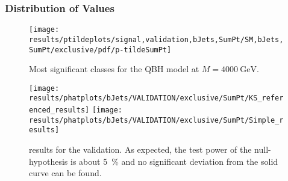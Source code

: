\subsubsection{Distribution of \ptilde Values}
\begin{figure}
    \centering
    
    \vspace{1\baselineskip}
    \texttt{[image: results/ptildeplots/signal,validation,bJets,SumPt/SM,bJets,SumPt/exclusive/pdf/p-tildeSumPt]}
    \caption{Most significant classes for the \ac{QBH} model at $M = \SI{4000}{\GeV}$.}
\end{figure}
%
%
%    
%
%
%
%

\begin{figure}
    \centering
    \texttt{[image: results/phatplots/bJets/VALIDATION/exclusive/SumPt/KS\_referenced\_results]}
    \texttt{[image: results/phatplots/bJets/VALIDATION/exclusive/SumPt/Simple\_results]}
    \caption{\phat results for the validation. As expected, the test power of the null-hypothesis is about \SI{5}{\percent} and no significant deviation from the solid curve can be found.}
\end{figure}

